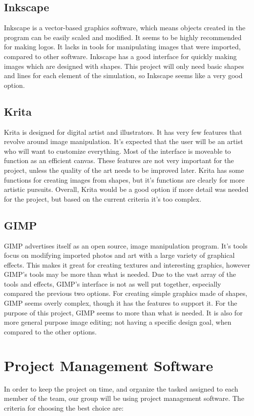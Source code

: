 \documentclass[capstone.tex]{subfiles}
\begin{document}
\subsection{Inkscape}
Inkscape is a vector-based graphics software, which means objects created in the program can be easily scaled and modified. It seems to be highly recommended for making logos. It lacks in tools for manipulating images that were imported, compared to other software. Inkscape has a good interface for quickly making images which are designed with shapes. This project will only need basic shapes and lines for each element of the simulation, so Inkscape seems like a very good option.
\cite{inkscape}
\subsection{Krita}
Krita is designed for digital artist and illustrators. It has very few features that revolve around image manipulation. It's expected that the user will be an artist who will want to customize everything. Most of the interface is moveable to function as an efficient canvas. These features are not very important for the project, unless the quality of the art needs to be improved later. Krita has some functions for creating images from shapes, but it’s functions are clearly for more artistic pursuits. Overall, Krita would be a good option if more detail was needed for the project, but based on the current criteria it’s too complex.
\cite{krita}
\subsection{GIMP}
GIMP advertises itself as an open source, image manipulation program. It’s tools focus on modifying imported photos and art with a large variety of graphical effects. This makes it great for creating textures and interesting graphics, however GIMP’s tools may be more than what is needed. Due to the vast array of the tools and effects, GIMP’s interface is not as well put together, especially compared the previous two options. For creating simple graphics made of shapes, GIMP seems overly complex, though it has the features to support it. For the purpose of this project, GIMP seems to more than what is needed. It is also for more general purpose image editing; not having a specific design goal, when compared to the other options.
\cite{gimp}

\section{Project Management Software}
In order to keep the project on time, and organize the tasked assigned to each member of the team, our group will be using project management software. The criteria for choosing the best choice are:
\end{document}
